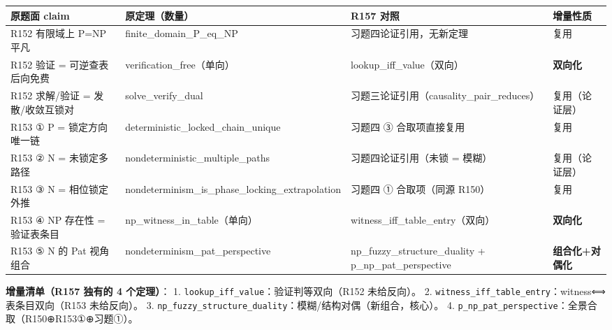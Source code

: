 \documentclass[
]{article}
\newcounter{none} %
\begin{document}
{\def\LTcaptype{none} %
\begin{longtable}[]{@{}
 >{\raggedright\arraybackslash}p{}
 >{\raggedright\arraybackslash}p{}
 >{\raggedright\arraybackslash}p{}
 >{\raggedright\arraybackslash}p{}@{}}
\toprule\noalign{}
\begin{minipage}[b]{\linewidth}\raggedright
原题面 claim
\end{minipage} & \begin{minipage}[b]{\linewidth}\raggedright
原定理（数量）
\end{minipage} & \begin{minipage}[b]{\linewidth}\raggedright
R157 对照
\end{minipage} & \begin{minipage}[b]{\linewidth}\raggedright
增量性质
\end{minipage} \\
\midrule\noalign{}
\endhead
\bottomrule\noalign{}
\endlastfoot
R152 有限域上 P=NP 平凡 & finite\_domain\_P\_eq\_NP &
习题四论证引用，无新定理 & 复用 \\
R152 验证 = 可逆查表后向免费 & verification\_free（单向） &
lookup\_iff\_value（双向） & \textbf{双向化} \\
R152 求解/验证 = 发散/收敛互锁对 & solve\_verify\_dual &
习题三论证引用（causality\_pair\_reduces） & 复用（论证层） \\
R153 ① P = 锁定方向唯一链 & deterministic\_locked\_chain\_unique &
习题四 ③ 合取项直接复用 & 复用 \\
R153 ② N = 未锁定多路径 & nondeterministic\_multiple\_paths &
习题四论证引用（未锁 = 模糊） & 复用（论证层） \\
R153 ③ N = 相位锁定外推 &
nondeterminism\_is\_phase\_locking\_extrapolation & 习题四 ①
合取项（同源 R150） & 复用 \\
R153 ④ NP 存在性 = 验证表条目 & np\_witness\_in\_table（单向） &
witness\_iff\_table\_entry（双向） & \textbf{双向化} \\
R153 ⑤ N 的 Pat 视角组合 & nondeterminism\_pat\_perspective &
np\_fuzzy\_structure\_duality + p\_np\_pat\_perspective &
\textbf{组合化+对偶化} \\
\end{longtable}
}

\textbf{增量清单（R157 独有的 4 个定理）}： 1.
\texttt{lookup\_iff\_value}：验证判等双向（R152 未给反向）。 2.
\texttt{witness\_iff\_table\_entry}：witness⟺表条目双向（R153
未给反向）。 3.
\texttt{np\_fuzzy\_structure\_duality}：模糊/结构对偶（新组合，核心）。
4. \texttt{p\_np\_pat\_perspective}：全景合取（R150⊕R153①⊕习题①）。
\end{document}
